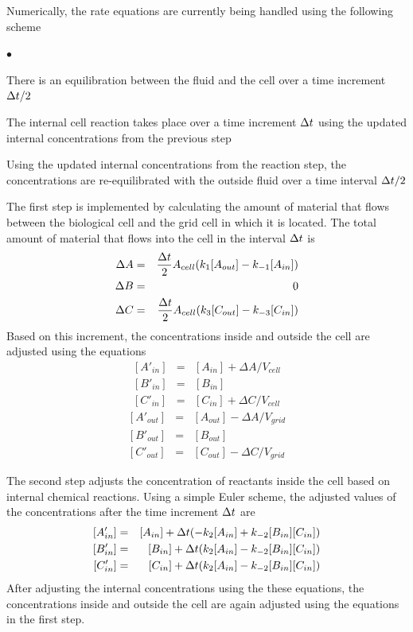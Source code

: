 \documentclass[12pt]{article}
\begin{document}
Numerically, the rate equations are currently being handled using the following scheme
\begin{list}{$\bullet$}{}
\item There is an equilibration between the fluid and the cell over a time
increment $\Delta t/2$
\item The internal cell reaction takes place over a time increment $\Delta t$
using the updated internal concentrations from the previous step
\item Using the updated internal concentrations from the reaction step, the
concentrations are re-equilibrated with the outside fluid over a time interval
$\Delta t/2$
\end{list}
The first step is implemented by calculating the amount of material that flows
between the biological cell and the grid cell in which it is located.
The total amount of
material that flows into the cell in the interval $\Delta t$ is
\begin{eqnarray*}
\Delta A & = & \frac{\Delta t}{2} A_{cell}(k_1 [A_{out}]-k_{-1} [A_{in}]) \\
\Delta B & = & 0 \\
\Delta C & = & \frac{\Delta t}{2} A_{cell}(k_3 [C_{out}]-k_{-3} [C_{in}]) \\
\end{eqnarray*}
Based on this increment, the concentrations inside and outside the cell are
adjusted using the equations
\begin{eqnarray}
\nonumber
[A'_{in}] &=& [A_{in}] + \Delta A/V_{cell} \\
\nonumber
[B'_{in}]  &=& [B_{in}] \\
\nonumber
[C'_{in}] &=& [C_{in}] + \Delta C/V_{cell}
\end{eqnarray}
\begin{eqnarray}
\nonumber
[A'_{out}] &=& [A_{out}] - \Delta A/V_{grid} \\
\nonumber
[B'_{out}]  & = & [B_{out}] \\
\nonumber
[C'_{out}] &=& [C_{out}] - \Delta C/V_{grid}
\end{eqnarray}

The second step adjusts the concentration of reactants inside the cell based on
internal chemical reactions. Using a simple Euler scheme, the adjusted values of
the concentrations after the time increment $\Delta t$ are
\begin{eqnarray}
\nonumber
[A'_{in}] &=& [A_{in}] + \Delta t(-k_2 [A_{in}] + k_{-2} [B_{in}][C_{in}]) \\
\nonumber
[B'_{in}] &=& [B_{in}] + \Delta t(k_2 [A_{in}] - k_{-2} [B_{in}][C_{in}]) \\
\nonumber
[C'_{in}] &=& [C_{in}] + \Delta t(k_2 [A_{in}] - k_{-2} [B_{in}][C_{in}])
\end{eqnarray}
After adjusting the internal concentrations using the these equations, the
concentrations inside and outside the cell are again adjusted using the
equations in the first step.
\end{document}
